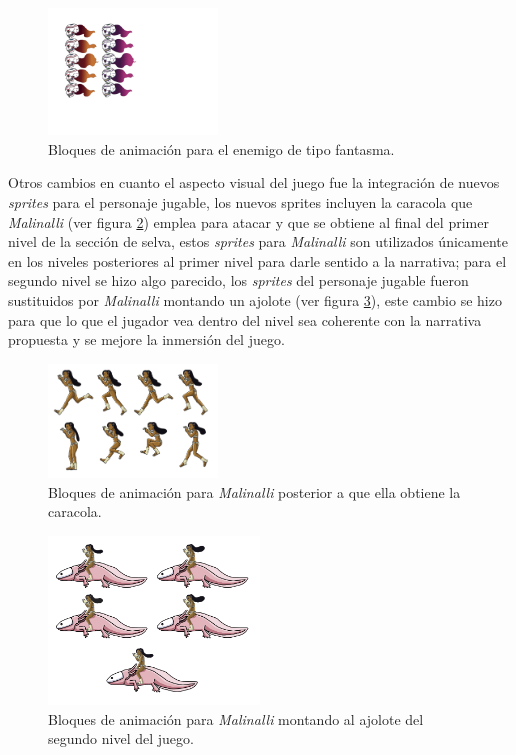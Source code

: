 \begin{figure}[h]
	\centering
	\includegraphics[width=0.4\textwidth]{05TrabajoReali/imagenes/fantasmas.png}
 	\caption{Bloques de animación para el enemigo de tipo fantasma.}
	\label{fig:FantasmaAnimacion}		
\end{figure}

Otros cambios en cuanto el aspecto visual del juego fue la integración de nuevos 
\textit{sprites} para el personaje jugable, los nuevos sprites incluyen la 
caracola que \textit{Malinalli} (ver figura \ref{fig:MalinalliCaracola}) emplea 
para atacar y que se obtiene al final del primer nivel de la sección de selva, 
estos \textit{sprites} para \textit{Malinalli} son utilizados únicamente en los 
niveles posteriores al primer nivel para darle sentido a la narrativa; para el 
segundo nivel se hizo algo parecido, los \textit{sprites} del personaje jugable 
fueron sustituidos por \textit{Malinalli} montando un ajolote (ver figura 
\ref{fig:MalinalliAjolote}), este cambio se hizo para que lo que el jugador vea 
dentro del nivel sea coherente con la narrativa propuesta y se mejore la inmersión del juego. 

\begin{figure}[h]
	\centering
	\includegraphics[width=0.4\textwidth]{05TrabajoReali/imagenes/MalinalliArma.png}
 	\caption{Bloques de animación para \textit{Malinalli} posterior a que ella obtiene la caracola.}
	\label{fig:MalinalliCaracola}		
\end{figure}

\begin{figure}[h]
	\centering
	\includegraphics[width=0.5\textwidth]{05TrabajoReali/imagenes/MalinaliAjolote.png}
 	\caption{Bloques de animación para \textit{Malinalli} montando al ajolote del segundo nivel del juego.}
	\label{fig:MalinalliAjolote}		
\end{figure}


